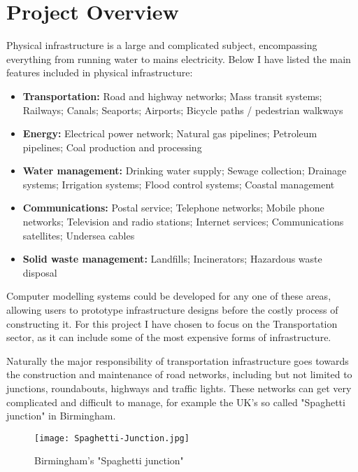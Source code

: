 \section{Project Overview}

    Physical infrastructure is a large and complicated subject, encompassing everything from running water to mains electricity. Below I have listed the main features included in physical infrastructure:

    \begin{itemize}
        \item \textbf{Transportation:} Road and highway networks; Mass transit systems; Railways; Canals; Seaports; Airports; Bicycle paths / pedestrian walkways

        \item \textbf{Energy:} Electrical power network; Natural gas pipelines; Petroleum pipelines; Coal production and processing

        \item \textbf{Water management:} Drinking water supply; Sewage collection; Drainage systems; Irrigation systems; Flood control systems; Coastal management

        \item \textbf{Communications:} Postal service; Telephone networks; Mobile phone networks; Television and radio stations; Internet services; Communications satellites; Undersea cables

        \item \textbf{Solid waste management:} Landfills; Incinerators; Hazardous waste disposal
    \end{itemize}

    Computer modelling systems could be developed for any one of these areas, allowing users to prototype infrastructure designs before the costly process of constructing it. For this project I have chosen to focus on the Transportation sector, as it can include some of the most expensive forms of infrastructure.

    Naturally the major responsibility of transportation infrastructure goes towards the construction and maintenance of road networks, including but not limited to junctions, roundabouts, highways and traffic lights.
    These networks can get very complicated and difficult to manage, for example the UK's so called "Spaghetti junction" in Birmingham.

    \begin{figure}[ht]
        \texttt{[image: Spaghetti-Junction.jpg]}
        \centering
        \caption{Birmingham's "Spaghetti junction" \cite{Spaghetti-Junction}}
    \end{figure}

